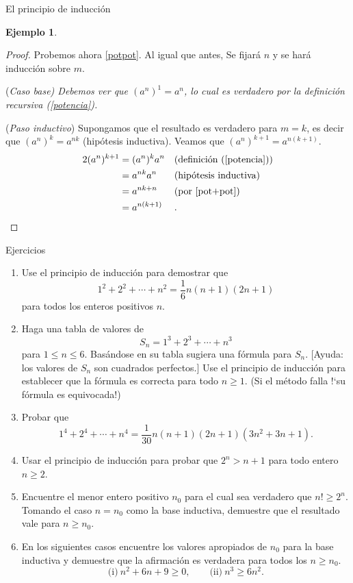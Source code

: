\documentclass[11pt,spanish,makeidx]{amsbook}
\theoremstyle{definition}
\newtheorem{ejemplo}{Ejemplo}[section]
\theoremstyle{remark}
\begin{document}
\begin{section}{El principio de inducción}
\begin{ejemplo}
\begin{proof}
Probemos ahora \ref{potpot}. Al igual que antes, Se fijará $n$ y se hará inducción sobre $m$.

\noindent(\it Caso  base\rm) Debemos ver que $(a^n)^1 = a^n$, lo cual es verdadero por la definición recursiva (\ref{potencia}). 

\noindent ({\it Paso  inductivo}) Supongamos que el resultado es verdadero para $m=k$, es decir que  $(a^n)^k = a^{nk}$ (hipótesis inductiva). Veamos que  $(a^n)^{k+1} = a^{n(k+1)}$. 
\begin{alignat*}2
(a^n)^{k+1} &= (a^n)^{k}a^n&  & \text{(definición (\ref{potencia}))} \\
&= a^{nk}a^n& & \text{(hipótesis inductiva)} \\
&= a^{nk+n}&  & \text{(por \ref{pot+pot})}\\
&= a^{n(k+1)}&  &.  
\end{alignat*}

\end{proof}
\end{ejemplo}

\begin{subsection}{Ejercicios}
\begin{enumerate}
\item Use el principio de inducción para demostrar que
$$
1^2+2^2+\cdots +n^2 = \frac16 n(n+1)(2n +1)
$$
para todos los enteros positivos $n$.
\item Haga una tabla de valores de
$$
S_n = 1^3+2^3+\cdots +n^3
$$
para $1 \le n\le 6$. Basándose en su tabla sugiera una fórmula para $S_n$. [Ayuda: los valores de $S_n$ son cuadrados perfectos.] Use el principio de inducción para establecer que la fórmula es correcta para todo $n\ge 1$. (Si el método falla !`su fórmula es equivocada!)
\item Probar que
$$
1^4+2^4+\cdots+n^4= \frac{1}{30}n(n+1)(2n+1)(3n^2+3n+1).
$$
\item Usar el principio de inducción para probar que $2^n>n+1$ para todo entero $n\ge2$.
\item Encuentre el menor entero positivo $n_0$ para el cual sea verdadero que $n! \ge 2^n$. Tomando el caso $n=n_0$ como la base inductiva, demuestre que el resultado vale para $n\ge n_0$.
\item En los siguientes casos encuentre los valores apropiados de $n_0$ para la base inductiva y demuestre que la afirmación es verdadera para todos los $n\ge n_0$.
$$
\text{(i)} \ n^2 +6n + 9 \ge 0, \qquad \text{(ii)} \ n^3 \ge 6n^2.
$$
\end{enumerate}
\end{subsection}
\end{section}
\end{document}

